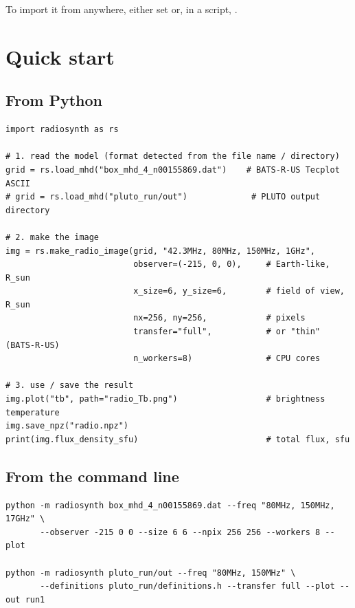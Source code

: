 To import it from anywhere, either set 
or, in a script, .

\chapter{Quick start}

\section{From Python}

\begin{lstlisting}[style=pyex]
import radiosynth as rs

# 1. read the model (format detected from the file name / directory)
grid = rs.load_mhd("box_mhd_4_n00155869.dat")    # BATS-R-US Tecplot ASCII
# grid = rs.load_mhd("pluto_run/out")             # PLUTO output directory

# 2. make the image
img = rs.make_radio_image(grid, "42.3MHz, 80MHz, 150MHz, 1GHz",
                          observer=(-215, 0, 0),     # Earth-like, R_sun
                          x_size=6, y_size=6,        # field of view, R_sun
                          nx=256, ny=256,            # pixels
                          transfer="full",           # or "thin" (BATS-R-US)
                          n_workers=8)               # CPU cores

# 3. use / save the result
img.plot("tb", path="radio_Tb.png")                  # brightness temperature
img.save_npz("radio.npz")
print(img.flux_density_sfu)                          # total flux, sfu
\end{lstlisting}

\section{From the command line}

\begin{lstlisting}
python -m radiosynth box_mhd_4_n00155869.dat --freq "80MHz, 150MHz, 17GHz" \
       --observer -215 0 0 --size 6 6 --npix 256 256 --workers 8 --plot

python -m radiosynth pluto_run/out --freq "80MHz, 150MHz" \
       --definitions pluto_run/definitions.h --transfer full --plot --out run1
\end{lstlisting}

